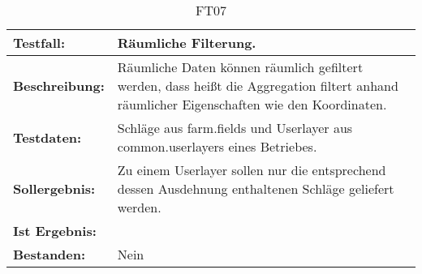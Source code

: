 \begin{table}[h!]
\centering
\small
\begin{tabular}{p{2.8cm}|p{12cm}}
\textbf{Testfall:} & Räumliche Filterung. \\ \hline
\textbf{Beschreibung:} & Räumliche Daten können räumlich gefiltert werden, dass heißt die Aggregation filtert anhand räumlicher Eigenschaften wie den Koordinaten. \\ \hline
\textbf{Testdaten:} & Schläge aus farm.fields und Userlayer aus common.userlayers eines Betriebes. \\ \hline
\textbf{Sollergebnis:} & Zu einem Userlayer sollen nur die entsprechend dessen Ausdehnung enthaltenen Schläge geliefert werden. \\ \hline
\textbf{Ist Ergebnis:} &  \\ \hline %
\textbf{Bestanden:} & Nein \\
\end{tabular}
\caption*{FT07}
\end{table}

\capstarttrue
\newpage